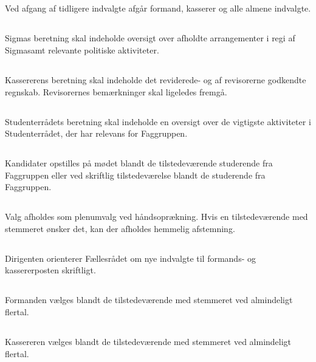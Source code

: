 \documentclass[danish,a4paper,twocolumn]{article}
\newcommand{\foreningen}{Sigma}
\begin{document}
\subsection{}Ved afgang af tidligere indvalgte afgår formand, kasserer og alle almene indvalgte.
\subsection{}\foreningen s beretning skal indeholde oversigt over afholdte arrangementer i regi af \foreningen samt relevante politiske aktiviteter.
\subsection{}Kassererens beretning skal indeholde det reviderede- og af revisorerne godkendte regnskab. Revisorernes bemærkninger skal ligeledes fremgå.
\subsection{}Studenterrådets beretning skal indeholde en oversigt over de vigtigste aktiviteter i Studenterrådet, der har relevans for Faggruppen.
\subsection{}Kandidater opstilles på mødet blandt de tilstedeværende studerende fra Faggruppen eller ved skriftlig tilstedeværelse blandt de studerende fra Faggruppen.
\subsection{}Valg afholdes som plenumvalg ved håndsoprækning. Hvis en tilstedeværende med stemmeret ønsker det, kan der afholdes hemmelig afstemning.
\subsection{}\label{stk:dirigent}Dirigenten orienterer Fællesrådet om nye indvalgte til formands- og kassererposten skriftligt.
\subsection{}Formanden vælges blandt de tilstedeværende med stemmeret ved almindeligt flertal. 
\subsection{}Kassereren vælges blandt de tilstedeværende med stemmeret ved almindeligt flertal.
\end{document}
